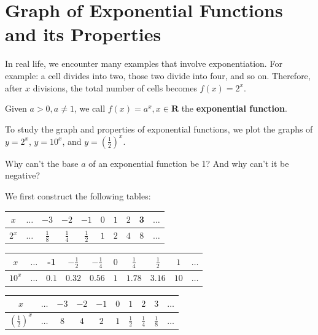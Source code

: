\documentclass{report}
\begin{document}
\section*{Graph of Exponential Functions and its Properties}

In real life, we encounter many examples that involve exponentiation. For example: a cell divides into two, those two divide into four, and so on. Therefore, after $x$ divisions, the total number of cells becomes $f(x)=2^x$.

Given $a > 0, a \neq 1$, we call $f(x) = a^x, x \in \boldsymbol{R}$ the \textbf{exponential function}.

To study the graph and properties of exponential functions, we plot the graphs of $y = 2^x$, $y = 10^x$, and $y = \left(\frac{1}{2}\right)^x$.

\begin{think}
	
	Why can't the base $a$ of an exponential function be 1? And why can't it be negative?
\end{think}

We first construct the following tables:
\begin{multicols}{2}
	\begin{center}
		\begin{tabular}{|c|c|c|c|c|c|c|c|c|c|}
			\hline$x$    & $\ldots$ & $-3$          & $-2$          & $-1$          & $0$ & $1$ & $2$ & 3   & $\ldots$ \\
			\hline $2^x$ & $\ldots$ & $\frac{1}{8}$ & $\frac{1}{4}$ & $\frac{1}{2}$ & $1$ & $2$ & $4$ & $8$ & $\ldots$ \\
			\hline
		\end{tabular}
	\end{center}
	\begin{center}
		\vspace*{-1em}
		\begin{tabular}{|c|c|c|c|c|c|c|c|c|c|}
			\hline$x$     & $\ldots$ & -1    & $-\frac{1}{2}$ & $-\frac{1}{4}$ & $0$ & $\frac{1}{4}$ & $\frac{1}{2}$ & $1$  & $\ldots$ \\
			\hline $10^x$ & $\ldots$ & $0.1$ & $0.32$         & $0.56$         & $1$ & $1.78$        & $3.16$        & $10$ & $\ldots$ \\
			\hline
		\end{tabular}
	\end{center}
\end{multicols}
\vspace{-3em}
\begin{center}
	\begin{tabular}{|c|c|c|c|c|c|c|c|c|c|}
		\hline$x$                           & $\ldots$ & $-3$ & $-2$ & $-1$ & $0$ & $1$           & $2$           & $3$           & $\ldots$ \\
		\hline $\left(\frac{1}{2}\right)^x$ & $\ldots$ & $8$  & $4$  & $2$  & $1$ & $\frac{1}{2}$ & $\frac{1}{4}$ & $\frac{1}{8}$ & $\ldots$ \\
		\hline
	\end{tabular}
\end{center}
\end{document}
